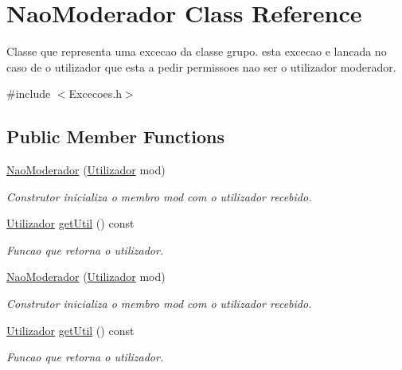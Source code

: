\hypertarget{class_nao_moderador}{}\section{Nao\+Moderador Class Reference}
\label{class_nao_moderador}


Classe que representa uma excecao da classe grupo. esta excecao e lancada no caso de o utilizador que esta a pedir permissoes nao ser o utilizador moderador.  




{\ttfamily \#include $<$Excecoes.\+h$>$}

\subsection*{Public Member Functions}
\begin{DoxyCompactItemize}
\item 
\hyperlink{class_nao_moderador_a7b454f79c86898f0671d4dbcf7f60c6b}{Nao\+Moderador} (\hyperlink{class_utilizador}{Utilizador} mod)
\begin{DoxyCompactList}\small\item\em Construtor inicializa o membro mod com o utilizador recebido. \end{DoxyCompactList}\item 
\hyperlink{class_utilizador}{Utilizador} \hyperlink{class_nao_moderador_a9bc9cc44da7f0273b511e3d3b666f6e0}{get\+Util} () const 
\begin{DoxyCompactList}\small\item\em Funcao que retorna o utilizador. \end{DoxyCompactList}\item 
\hyperlink{class_nao_moderador_a7b454f79c86898f0671d4dbcf7f60c6b}{Nao\+Moderador} (\hyperlink{class_utilizador}{Utilizador} mod)
\begin{DoxyCompactList}\small\item\em Construtor inicializa o membro mod com o utilizador recebido. \end{DoxyCompactList}\item 
\hyperlink{class_utilizador}{Utilizador} \hyperlink{class_nao_moderador_a9bc9cc44da7f0273b511e3d3b666f6e0}{get\+Util} () const 
\begin{DoxyCompactList}\small\item\em Funcao que retorna o utilizador. \end{DoxyCompactList}\end{DoxyCompactItemize}


